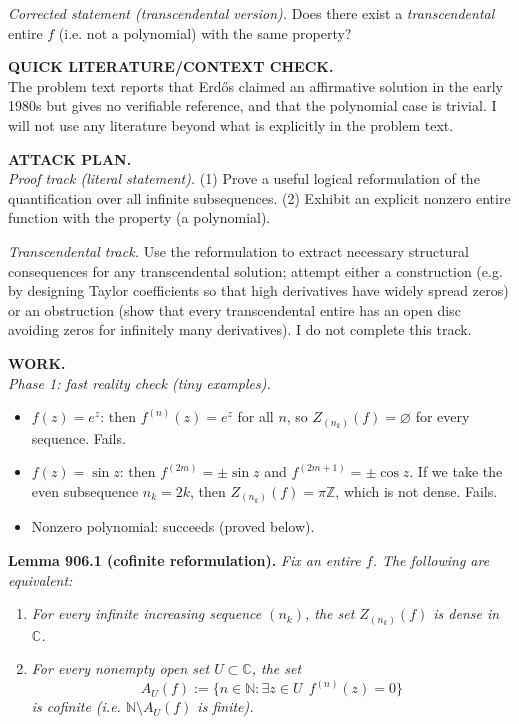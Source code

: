 \smallskip
\noindent\emph{Corrected statement (transcendental version).}  Does there exist a \emph{transcendental} entire $f$ (i.e. not a polynomial) with the same property?

\medskip
\noindent\textbf{QUICK LITERATURE/CONTEXT CHECK.}\\
The problem text reports that Erd\H{o}s claimed an affirmative solution in the early 1980s but gives no verifiable reference, and that the polynomial case is trivial. I will not use any literature beyond what is explicitly in the problem text.

\medskip
\noindent\textbf{ATTACK PLAN.}\\
\emph{Proof track (literal statement).}  (1) Prove a useful logical reformulation of the quantification over all infinite subsequences. (2) Exhibit an explicit nonzero entire function with the property (a polynomial).

\smallskip
\noindent\emph{Transcendental track.}  Use the reformulation to extract necessary structural consequences for any transcendental solution; attempt either a construction (e.g. by designing Taylor coefficients so that high derivatives have widely spread zeros) or an obstruction (show that every transcendental entire has an open disc avoiding zeros for infinitely many derivatives). I do not complete this track.

\medskip
\noindent\textbf{WORK.}\\
\emph{Phase 1: fast reality check (tiny examples).}
\begin{itemize}
\item $f(z)=e^z$: then $f^{(n)}(z)=e^z$ for all $n$, so $Z_{(n_k)}(f)=\varnothing$ for every sequence. Fails.
\item $f(z)=\sin z$: then $f^{(2m)}=\pm\sin z$ and $f^{(2m+1)}=\pm\cos z$. If we take the even subsequence $n_k=2k$, then $Z_{(n_k)}(f)=\pi\mathbb{Z}$, which is not dense. Fails.
\item Nonzero polynomial: succeeds (proved below).
\end{itemize}

\medskip
\noindent\textbf{Lemma 906.1 (cofinite reformulation).}  \emph{Fix an entire $f$. The following are equivalent:}
\begin{enumerate}
\item[(A)] \emph{For every infinite increasing sequence $(n_k)$, the set $Z_{(n_k)}(f)$ is dense in $\mathbb{C}$.}
\item[(B)] \emph{For every nonempty open set $U\subset\mathbb{C}$, the set}
\[A_U(f):=\{n\in\mathbb{N}: \exists z\in U\ \ f^{(n)}(z)=0\}\]
\emph{is cofinite (i.e. $\mathbb{N}\setminus A_U(f)$ is finite).}
\end{enumerate}

